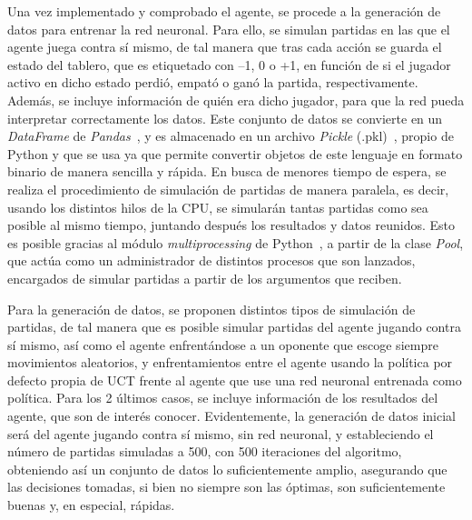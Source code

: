 \documentclass[conference,a4paper]{IEEEtran}
\begin{document}
Una vez implementado y comprobado el agente, se procede a la generación de datos para entrenar la red neuronal. Para ello, 
se simulan partidas en las que el agente juega contra sí mismo, de tal manera que tras cada acción se guarda el estado del tablero, 
que es etiquetado con –1, 0 o +1, en función de si el jugador activo en dicho estado perdió, empató o ganó la partida, respectivamente. 
Además, se incluye información de quién era dicho jugador, para que la red pueda interpretar correctamente los datos. Este conjunto 
de datos se convierte en un \emph{DataFrame} de \emph{Pandas}~\cite{b9}, y es almacenado en un archivo \emph{Pickle} (.pkl)~\cite{b10}, propio de Python y que se usa 
ya que permite convertir objetos de este lenguaje en formato binario de manera sencilla y rápida. En busca de menores tiempo de espera, 
se realiza el procedimiento de simulación de partidas de manera paralela, es decir, usando los distintos hilos de la CPU, se simularán tantas 
partidas como sea posible al mismo tiempo, juntando después los resultados y datos reunidos. Esto es posible gracias al módulo \emph{multiprocessing} 
de Python~\cite{b11}, a partir de la clase \emph{Pool}, que actúa como un administrador de distintos procesos que son lanzados, 
encargados de simular partidas a partir de los argumentos que reciben.

Para la generación de datos, se proponen distintos tipos de simulación de partidas, de tal manera que es posible simular partidas 
del agente jugando contra sí mismo, así como el agente enfrentándose a un oponente que escoge siempre movimientos aleatorios, 
y enfrentamientos entre el agente usando la política por defecto propia de UCT frente al agente que use una red neuronal entrenada 
como política. Para los 2 últimos casos, se incluye información de los resultados del agente, que son de interés conocer. Evidentemente, 
la generación de datos inicial será del agente jugando contra sí mismo, sin red neuronal, y estableciendo el número de partidas 
simuladas a 500, con 500 iteraciones del algoritmo, obteniendo así un conjunto de datos lo suficientemente amplio, asegurando que 
las decisiones tomadas, si bien no siempre son las óptimas, son suficientemente buenas y, en especial, rápidas.
\end{document}
